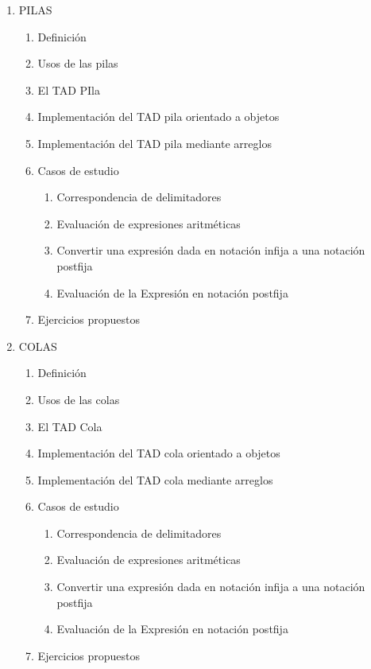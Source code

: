 \begin{enumerate}
	\item \textsc{PILAS}
	\begin{enumerate}
		\item Definición
		\item Usos de las pilas
		\item El TAD PIla
		\item Implementación del TAD pila orientado a objetos
		\item Implementación del TAD pila mediante arreglos
		\item Casos de estudio
		\begin{enumerate}
			\item Correspondencia de delimitadores
			\item Evaluación de expresiones aritméticas
			\item Convertir una expresión dada en notación infija a una notación postfija 
			\item Evaluación de la Expresión en notación postfija
		\end{enumerate}		
		\item Ejercicios propuestos
	\end{enumerate}
		
	\item \textsc{COLAS}
	\begin{enumerate}
		\item Definición
		\item Usos de las colas
		\item El TAD Cola
		\item Implementación del TAD cola orientado a objetos
		\item Implementación del TAD cola mediante arreglos
		\item Casos de estudio
		\begin{enumerate}
			\item Correspondencia de delimitadores
			\item Evaluación de expresiones aritméticas
			\item Convertir una expresión dada en notación infija a una notación postfija 
			\item Evaluación de la Expresión en notación postfija
		\end{enumerate}		
		\item Ejercicios propuestos
	\end{enumerate}		


\end{enumerate}
